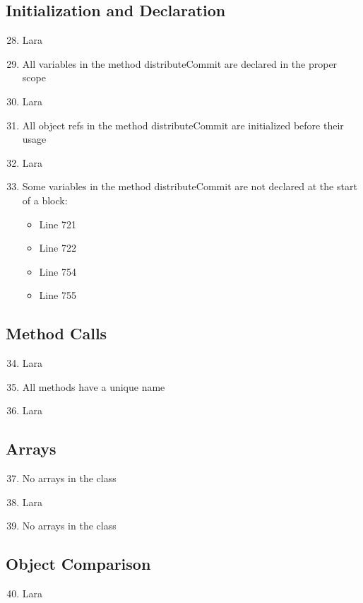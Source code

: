 \subsection{Initialization and Declaration}
\begin{enumerate}
	\setcounter{enumi}{27}
	\item Lara
	\item All variables in the method distributeCommit are declared in the proper scope
	\item Lara
	\item All object refs in the method distributeCommit are initialized before their usage
	\item Lara
	\item Some variables in the method distributeCommit are not declared at the start of a block:
	\begin{itemize}
		\item Line 721
		\item Line 722
		\item Line 754
		\item Line 755
	\end{itemize}
\end{enumerate}
\subsection{Method Calls}
\begin{enumerate}
	\setcounter{enumi}{33}
	\item Lara
	\item All methods have a unique name
	\item Lara
\end{enumerate}
\subsection{Arrays}
\begin{enumerate}
	\setcounter{enumi}{36}
	\item No arrays in the class
	\item Lara
	\item No arrays in the class
\end{enumerate}
\subsection{Object Comparison}
\begin{enumerate}
	\setcounter{enumi}{39}
	\item Lara
\end{enumerate}
